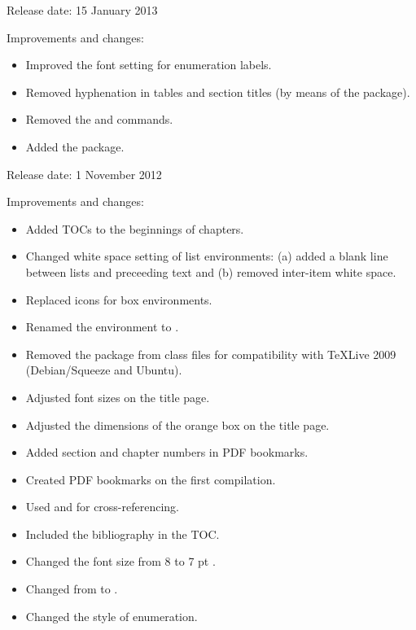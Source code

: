 \documentclass[]{xfel.eu-report}
\begin{document}
		
		
Release date: 15 January 2013

Improvements and changes: 

\begin{itemize}
	\item Improved the font setting for enumeration labels.
	\item Removed hyphenation in tables and section titles (by means of the  package).
	\item Removed the  and  commands.
	\item Added the  package.
\end{itemize}

\newpage




Release date: 1 November 2012

Improvements and changes: 

\begin{itemize}
	\item Added TOCs to the beginnings of chapters.
	\item Changed white space setting of list environments: (a) added a blank line between lists and preceeding text and (b) removed inter-item white space.
	\item Replaced icons for box environments.
	\item Renamed the  environment to .
	\item Removed the  package from class files for compatibility with \TeX Live 2009 (Debian/Squeeze and Ubuntu).
	\item Adjusted font sizes on the title page.
	\item Adjusted the dimensions of the orange box on the title page.
	\item Added section and chapter numbers in PDF bookmarks.
	\item Created PDF bookmarks on the first compilation.
	\item Used  and  for cross-referencing.
	\item Included the bibliography in the TOC.
	\item Changed the font size from 8 to 7 pt .
	\item Changed  from  to .
	\item Changed the style of enumeration.
\end{itemize}
\end{document}
